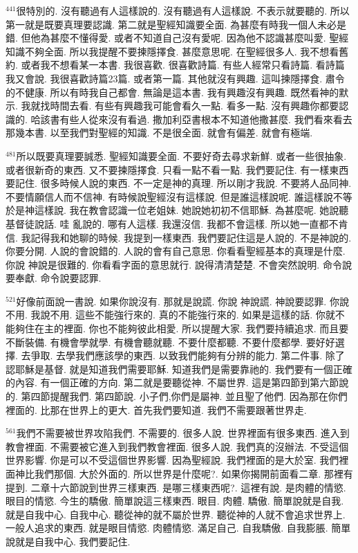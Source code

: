 \documentclass{book}
\begin{document}
$^{441}$很特別的.
沒有聽過有人這樣說的.
沒有聽過有人這樣說.
不表示就要聽的.
所以第一就是既要真理要認識.
第二就是聖經知識要全面.
為甚麼有時我一個人未必是錯.
但他為甚麼不懂得愛.
或者不知道自己沒有愛呢.
因為他不認識甚麼叫愛.
聖經知識不夠全面.
所以我提醒不要揀隱擇食.
甚麼意思呢.
在聖經很多人.
我不想看舊約.
或者我不想看某一本書.
我很喜歡.
很喜歡詩篇.
有些人經常只看詩篇.
看詩篇我又會說.
我很喜歡詩篇23篇.
或者第一篇.
其他就沒有興趣.
這叫揀隱擇食.
肅令的不健康.
所以有時我自己都會.
無論是這本書.
我有興趣沒有興趣.
既然看神的默示.
我就找時間去看.
有些有興趣我可能會看久一點.
看多一點.
沒有興趣你都要認識的.
哈該書有些人從來沒有看過.
撒加利亞書根本不知道他撒甚麼.
我們看來看去那幾本書.
以至我們對聖經的知識.
不是很全面.
就會有偏差.
就會有極端.

$^{481}$所以既要真理要誠悉.
聖經知識要全面.
不要好奇去尋求新鮮.
或者一些很抽象.
或者很新奇的東西.
又不要揀隱擇食.
只看一點不看一點.
我們要記住.
有一樣東西要記住.
很多時候人說的東西.
不一定是神的真理.
所以剛才我說.
不要將人品同神.
不要情願信人而不信神.
有時候說聖經沒有這樣說.
但是誰這樣說呢.
誰這樣說不等於是神這樣說.
我在教會認識一位老姐妹.
她說她初初不信耶穌.
為甚麼呢.
她說聽基督徒說話.
哇 亂說的.
哪有人這樣.
我還沒信.
我都不會這樣.
所以她一直都不肯信.
我記得我和她聊的時候.
我提到一樣東西.
我們要記住這是人說的.
不是神說的.
你要分開.
人說的會說錯的.
人說的會有自己意思.
你看看聖經基本的真理是什麼.
你說 神說是很難的.
你看看字面的意思就行.
說得清清楚楚.
不會突然說明.
命令說要奉獻.
命令說要認罪.

$^{521}$好像前面說一書說.
如果你說沒有.
那就是說謊.
你說 神說謊.
神說要認罪.
你說不用.
我說不用.
這些不能強行來的.
真的不能強行來的.
如果是這樣的話.
你就不能夠住在主的裡面.
你也不能夠彼此相愛.
所以提醒大家.
我們要持續追求.
而且要不斷裝備.
有機會學就學.
有機會聽就聽.
不要什麼都聽.
不要什麼都學.
要好好選擇.
去爭取.
去學我們應該學的東西.
以致我們能夠有分辨的能力.
第二件事.
除了認耶穌是基督.
就是知道我們需要耶穌.
知道我們是需要靠祂的.
我們要有一個正確的內容.
有一個正確的方向.
第二就是要聽從神.
不屬世界.
這是第四節到第六節說的.
第四節提醒我們.
第四節說.
小子們,你們是屬神.
並且聖了他們.
因為那在你們裡面的.
比那在世界上的更大.
首先我們要知道.
我們不需要跟著世界走.

$^{561}$我們不需要被世界攻陷我們.
不需要的.
很多人說.
世界裡面有很多東西.
進入到教會裡面.
不需要被它進入到我們教會裡面.
很多人說.
我們真的沒辦法.
不受這個世界影響.
你是可以不受這個世界影響.
因為聖經說.
我們裡面的是大於室.
我們裡面神比我們那個.
大於外面的.
所以世界是什麼呢?.
如果你揭開前面看二章.
那裡有提到.
二章十六節說到世界三樣東西.
是哪三樣東西呢?.
這裡有說.
是肉體的情慾.
眼目的情慾.
今生的驕傲.
簡單說這三樣東西.
眼目.
肉體.
驕傲.
簡單說就是自我.
就是自我中心.
自我中心.
聽從神的就不屬於世界.
聽從神的人就不會追求世界上.
一般人追求的東西.
就是眼目情慾.
肉體情慾.
滿足自己.
自我驕傲.
自我膨脹.
簡單說就是自我中心.
我們要記住.
\end{document}
